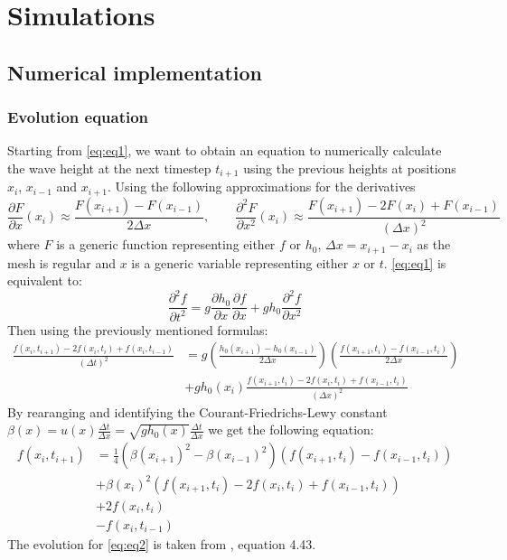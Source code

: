 \section{Simulations}

\subsection{Numerical implementation}

\subsubsection{Evolution equation}

Starting from \autoref{eq:eq1}, we want to obtain an equation to numerically calculate the wave height at the next timestep \(t_{i+1}\) using the previous heights at positions \(x_i\), \(x_{i-1}\) and \(x_{i+1}\). Using the following approximations for the derivatives
\begin{equation}
    \frac{\partial F}{\partial x}(x_i) \approx \frac{F(x_{i+1}) - F(x_{i-1})}{2 \Delta x}
    , \qquad
    \frac{\partial^2 F}{\partial x^2}(x_i) \approx \frac{F(x_{i+1}) - 2 F(x_i) + F(x_{i-1})}{(\Delta x)^2}
\end{equation}
where \(F\) is a generic function representing either \(f\) or \(h_0\), \(\Delta x = x_{i+1} - x_i\) as the mesh is regular and \(x\) is a generic variable representing either \(x\) or \(t\). \autoref{eq:eq1} is equivalent to:
\begin{equation}
    \frac{\partial^2 f}{\partial t^2} = g \frac{\partial h_0}{\partial x} \frac{\partial f}{\partial x} + g h_0 \frac{\partial^2 f}{\partial x^2}
\end{equation}
Then using the previously mentioned formulas:
\begin{equation}
    \begin{aligned}
        \frac{f(x_i, t_{i+1}) - 2 f(x_i, t_i) + f(x_i, t_{i-1})}{(\Delta t)^2} &= g \left( \frac{h_0(x_{i+1}) - h_0(x_{i-1})}{2 \Delta x} \right) \left( \frac{f(x_{i+1}, t_i) - f(x_{i-1}, t_i)}{2 \Delta x} \right) \\
        &+ g h_0(x_i) \frac{f(x_{i+1}, t_i) - 2 f(x_i, t_i) + f(x_{i-1}, t_i)}{(\Delta x)^2}
    \end{aligned}
\end{equation}
By rearanging and identifying the Courant-Friedrichs-Lewy constant \(\beta(x) = u(x) \frac{\Delta t}{\Delta x} = \sqrt{g h_0(x)} \frac{\Delta t}{\Delta x}\) we get the following equation:
\begin{equation}
    \begin{aligned}
        f(x_i, t_{i+1}) &= \frac{1}{4} \left( \beta(x_{i+1})^2 - \beta(x_{i-1})^2 \right) \left( f(x_{i+1}, t_i) - f(x_{i-1}, t_i) \right) \\
        &+ \beta(x_i)^2 (f(x_{i+1}, t_i) - 2 f(x_i, t_i) + f(x_{i-1}, t_i)) \\
        &+ 2 f(x_i,t_i) \\
        &- f(x_i,t_{i-1})
    \end{aligned}
\end{equation}
The evolution for \autoref{eq:eq2} is taken from \cite{physnumbook}, equation 4.43.

